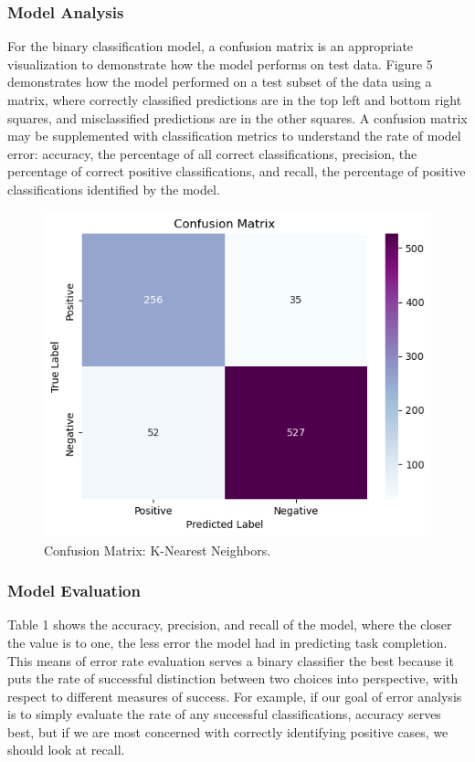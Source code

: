 \documentclass[11pt]{article}
\begin{document}
\subsubsection{Model Analysis}
For the binary classification model, a confusion matrix is an appropriate visualization to demonstrate how the model performs on test data. Figure 5 demonstrates how the model performed on a test subset of the data using a matrix, where correctly classified predictions are in the top left and bottom right squares, and misclassified predictions are in the other squares. A confusion matrix may be supplemented with classification metrics to understand the rate of model error: accuracy, the percentage of all correct classifications, precision, the percentage of correct positive classifications, and recall, the percentage of positive classifications identified by the model.

\begin{figure}[hbt!]
  \centering
  \includegraphics[width=375pt]{figures/confusion-matrix-knn}
  \caption{Confusion Matrix: K-Nearest Neighbors.}
\end{figure}

\subsubsection{Model Evaluation}
Table 1 shows the accuracy, precision, and recall of the model, where the closer the value is to one, the less error the model had in predicting task completion. This means of error rate evaluation serves a binary classifier the best because it puts the rate of successful distinction between two choices into perspective, with respect to different measures of success. For example, if our goal of error analysis is to simply evaluate the rate of any successful classifications, accuracy serves best, but if we are most concerned with correctly identifying positive cases, we should look at recall.
\end{document}
